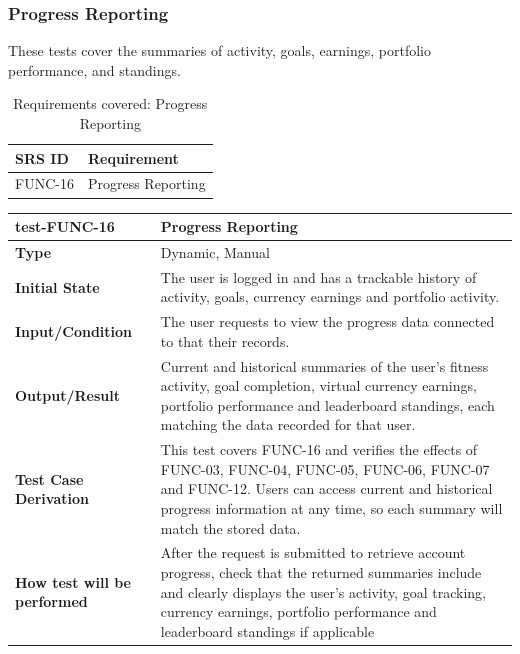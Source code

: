 \documentclass[12pt, titlepage]{article}
\begin{document}
\subsubsection{Progress Reporting}

These tests cover the summaries of activity, goals, earnings, portfolio performance, and standings.

\begin{table}[H]
  \caption{Requirements covered: Progress Reporting}
  \noindent\begin{tabularx}{\textwidth}{p{3cm}X}
  \toprule
  \textbf{SRS ID} & \textbf{Requirement} \\
  \midrule
  FUNC-16 & Progress Reporting \\
  \bottomrule
\end{tabularx}
\end{table}

\vspace{1em}

\noindent\begin{tabularx}{\textwidth}{>{\raggedright\arraybackslash}p{3.5cm}X}
  \toprule
  \textbf{test-FUNC-16} & \textbf{Progress Reporting}\\
  \midrule
  \textbf{Type} & Dynamic, Manual\\
  \textbf{Initial State} & The user is logged in and has a trackable history of activity, goals, currency earnings and portfolio activity.\\
  \textbf{Input/Condition} & The user requests to view the progress data connected to that their records.\\
  \textbf{Output/Result} & Current and historical summaries of the user's fitness activity, goal completion, virtual currency earnings, portfolio performance and leaderboard standings, each matching the data recorded for that user.\\
  \textbf{Test Case Derivation} & This test covers FUNC-16 and verifies the effects of  FUNC-03, FUNC-04, FUNC-05, FUNC-06, FUNC-07 and FUNC-12. Users can access current and historical progress information at any time, so each summary will match the stored data.\\
  \textbf{How test will be performed} & After the request is submitted to retrieve account progress, check that the returned summaries include and clearly displays the user's activity, goal tracking, currency earnings, portfolio performance and leaderboard standings if applicable\\
  \bottomrule
\end{tabularx}
\end{document}
